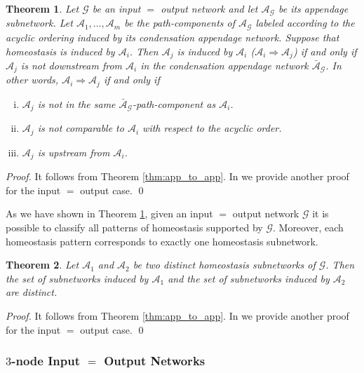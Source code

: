 \documentclass[a4paper,fleqn]{cas-dc}
\newtheorem{theorem}{Theorem}[section]
\begin{document}
\begin{theorem} \label{THM:HOMEO_INDUC}
Let $\mathcal{G}$ be an input $=$ output network and let $\mathcal{A}_{\mathcal{G}}$ be its appendage subnetwork.
Let $\mathcal{A}_1,\ldots,\mathcal{A}_m$ be the path-components of $\mathcal{A}_{\mathcal{G}}$ labeled according to the acyclic ordering induced by its condensation appendage network.
Suppose that homeostasis is induced by $\mathcal{A}_i$. Then $\mathcal{A}_j$ is induced by $\mathcal{A}_i$ ($\mathcal{A}_i \Rightarrow \mathcal{A}_j$) if and only if $\mathcal{A}_j$ is not downstream from $\mathcal{A}_i$ in the condensation appendage network $\bar{\mathcal{A}}_{\mathcal{G}}$.
In other words, $\mathcal{A}_i \Rightarrow \mathcal{A}_j$ if and only if
\begin{enumerate}[(i)]
\item $\mathcal{A}_j$ is not in the same $\bar{\mathcal{A}}_{\mathcal{G}}$-path-component as $\mathcal{A}_i$.
\item $\mathcal{A}_j$ is not comparable to $\mathcal{A}_i$ with respect to the acyclic order.
\item $\mathcal{A}_j$ is upstream from $\mathcal{A}_i$.
\end{enumerate}
\end{theorem}
\begin{proof}
It follows from Theorem \ref{thm:app_to_app}.
In \cite{antoneli2024} we provide another proof for the input $=$ output case.
\qed
\end{proof}

As we have shown in Theorem  \ref{THM:HOMEO_INDUC}, given an input $=$ output network $\mathcal{G}$ it is possible to classify all patterns of homeostasis supported by $\mathcal{G}$.
Moreover, each homeostasis pattern corresponds to exactly one homeostasis subnetwork.

\begin{theorem} \label{thm:bijective_corresp_i=o}
Let $\mathcal{A}_1$ and $\mathcal{A}_2$ be two distinct homeostasis subnetworks of $\mathcal{G}$. 
Then the set of subnetworks induced by $\mathcal{A}_1$ and the set of subnetworks induced by $\mathcal{A}_2$ are distinct.
\end{theorem}
\begin{proof}
It follows from Theorem \ref{thm:app_to_app}.
In \cite{antoneli2024} we provide another proof for the input $=$ output case.
\qed
\end{proof}

\subsubsection{$3$-node Input $=$ Output Networks}
\label{SSS:classification}
\end{document}
